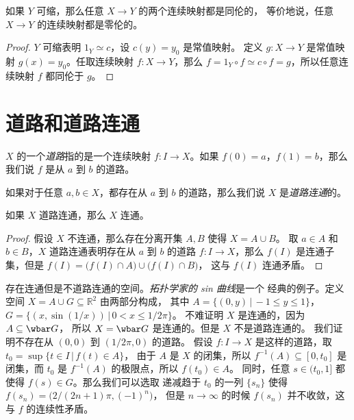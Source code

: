 \documentclass[fontset=none]{Notes}
\begin{document}
\begin{theorem}
  如果 $Y$ 可缩，那么任意 $X\to Y$ 的两个连续映射都是同伦的，
  等价地说，任意 $X\to Y$ 的连续映射都是零伦的。
\end{theorem}
\begin{proof}
  $Y$ 可缩表明 $1_Y\simeq c$，设 $c(y)=y_0$ 是常值映射。
  定义 $g:X\to Y$ 是常值映射 $g(x)=y_0$。任取连续映射 $f:X\to Y$，那么
  $f=1_Y\circ f\simeq c\circ f=g$，所以任意连续映射 $f$
  都同伦于 $g$。
\end{proof}
 
\section{道路和道路连通}

\begin{definition}
  $X$ 的一个\emph{道路}指的是一个连续映射 $f:I\to X$。如果 
  $f(0)=a$，$f(1)=b$，那么我们说 $f$ 是从 $a$ 到 $b$ 的道路。
\end{definition}

\begin{definition}
  如果对于任意 $a,b\in X$，都存在从 $a$ 到 $b$ 的道路，那么我们说
  $X$ 是\emph{道路连通}的。
\end{definition}

\begin{theorem}
  如果 $X$ 道路连通，那么 $X$ 连通。
\end{theorem}
\begin{proof}
  假设 $X$ 不连通，那么存在分离开集 $A,B$ 使得 $X=A\cup B$。
  取 $a\in A$ 和 $b\in B$，$X$ 道路连通表明存在从 $a$ 到 $b$
  的道路 $f:I\to X$，那么 $f(I)$ 是连通子集，但是
  $f(I)=\bigl(f(I)\cap A\bigr)\cup\bigl(f(I)\cap B\bigr)$，
  这与 $f(I)$ 连通矛盾。
\end{proof}

\begin{example}
  存在连通但是不道路连通的空间。\emph{拓扑学家的 sin 曲线}是一个
  经典的例子。定义空间 $X=A\cup G\subseteq \mathbb{R}^2$ 由两部分构成，
  其中 $A=\{(0,y)\,|\, -1\leq y\leq 1\}$，
  $G=\{(x,\sin(1/x))\,|\, 0<x\leq 1/2\pi\}$。
  不难证明 $X$ 是连通的，因为 $A\subseteq \wbar G$，
  所以 $X=\wbar G$ 是连通的。但是 $X$ 不是道路连通的。
  我们证明不存在从 $(0,0)$ 到 $(1/2\pi,0)$ 的道路。
  假设 $f:I\to X$ 是这样的道路，取 $t_0=\sup\{t\in I\,|\, f(t)\in A\}$，
  由于 $A$ 是 $X$ 的闭集，所以 $f^{-1}(A)\subseteq [0,t_0]$
  是闭集，而 $t_0$ 是 $f^{-1}(A)$ 的极限点，所以 $f(t_0)\in A$。
  同时，任意 $s\in (t_0,1]$ 都使得 $f(s)\in G$。那么我们可以选取
  递减趋于 $t_0$ 的一列 $\{s_n\}$ 使得 $f(s_n)=\bigl(2/(2n+1)\pi,(-1)^n\bigr)$，
  但是 $n\to\infty$ 的时候 $f(s_n)$ 并不收敛，这与 $f$ 的连续性矛盾。
\end{example}
\end{document}

